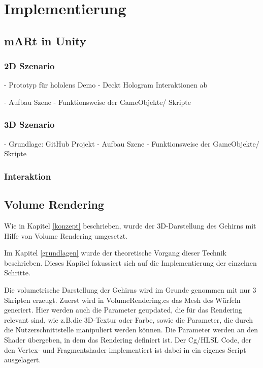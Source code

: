 
\chapter{Implementierung}
\label{implementierung}

\section{mARt in Unity}

\subsection{2D Szenario}
- Prototyp für hololens Demo
- Deckt Hologram Interaktionen ab

- Aufbau Szene
- Funktionsweise der GameObjekte/ Skripte

\subsection{3D Szenario}
\label{3dscene}

- Grundlage: GitHub Projekt
- Aufbau Szene
- Funktionsweise der GameObjekte/ Skripte

\subsection{Interaktion}

\section{Volume Rendering}

Wie in Kapitel \ref{konzept} beschrieben, wurde der 3D-Darstellung des Gehirns mit Hilfe von Volume Rendering umgesetzt. 

Im Kapitel \ref{grundlagen} wurde der theoretische Vorgang dieser Technik beschrieben. Dieses Kapitel fokussiert sich auf die Implementierung der einzelnen Schritte.

Die volumetrische Darstellung der Gehirns wird im Grunde genommen mit nur 3 Skripten erzeugt. Zuerst wird in VolumeRendering.cs das Mesh des Würfeln generiert. Hier werden auch die Parameter geupdated, die für das Rendering relevant sind, wie z.B.die 3D-Textur oder Farbe, sowie die Parameter, die durch die Nutzerschnittstelle manipuliert werden können. 
Die Parameter werden an den Shader übergeben, in dem das Rendering definiert ist. Der Cg/HLSL Code, der den Vertex- und Fragmentshader implementiert ist dabei in ein eigenes Script ausgelagert.

